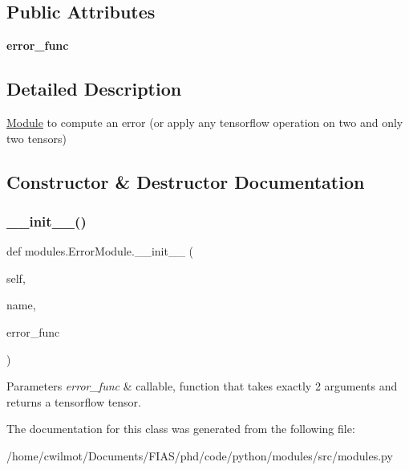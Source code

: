 \subsection*{Public Attributes}
\begin{DoxyCompactItemize}
\item 
\mbox{\label{classmodules_1_1_error_module_ac571881352c250096e78a90e1d8c1295}} 
{\bfseries error\+\_\+func}
\end{DoxyCompactItemize}


\subsection{Detailed Description}
\hyperlink{classmodules_1_1_module}{Module} to compute an error (or apply any tensorflow operation on two and only two tensors) 

\subsection{Constructor \& Destructor Documentation}
\mbox{\label{classmodules_1_1_error_module_ac657fdedba3e5af8e96faf1e9fdfdbdf}} 
\subsubsection{\texorpdfstring{\+\_\+\+\_\+init\+\_\+\+\_\+()}{\_\_init\_\_()}}
{\footnotesize\ttfamily def modules.\+Error\+Module.\+\_\+\+\_\+init\+\_\+\+\_\+ (\begin{DoxyParamCaption}\item[{}]{self,  }\item[{}]{name,  }\item[{}]{error\+\_\+func }\end{DoxyParamCaption})}


\begin{DoxyParams}{Parameters}
{\em error\+\_\+func} & callable, function that takes exactly 2 arguments and returns a tensorflow tensor. \\
\hline
\end{DoxyParams}


The documentation for this class was generated from the following file\+:\begin{DoxyCompactItemize}
\item 
/home/cwilmot/\+Documents/\+F\+I\+A\+S/phd/code/python/modules/src/modules.\+py\end{DoxyCompactItemize}
